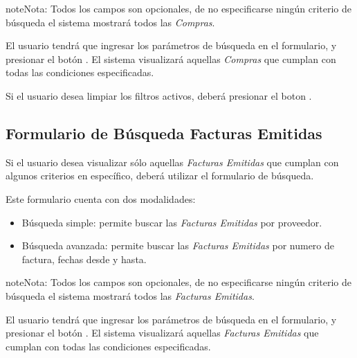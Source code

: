 \documentclass[a4paper,10pt,spanish]{sphinxmanual}
\begin{document}
\begin{notice}{note}{Nota:}
Todos los campos son opcionales, de no especificarse ningún criterio de búsqueda el sistema mostrará todos las \emph{Compras}.
\end{notice}

El usuario tendrá que ingresar los parámetros de búsqueda en el formulario, y presionar el botón . El sistema visualizará aquellas \emph{Compras} que cumplan con todas las condiciones especificadas.

Si el usuario desea limpiar los filtros activos, deberá presionar el boton .



\subsection{Formulario de Búsqueda Facturas Emitidas}
\label{compras:formulario-de-busqueda-facturas-emitidas}\label{compras:formulario-busqueda-factemit}
Si el usuario desea visualizar sólo aquellas \emph{Facturas Emitidas} que cumplan con algunos criterios en específico, deberá utilizar el formulario de búsqueda.


Este formulario cuenta con dos modalidades:
\begin{itemize}
\item {} 
Búsqueda simple: permite buscar las \emph{Facturas Emitidas} por proveedor.

\item {} 
Búsqueda avanzada: permite buscar las \emph{Facturas Emitidas} por numero de factura, fechas desde y hasta.

\end{itemize}

\begin{notice}{note}{Nota:}
Todos los campos son opcionales, de no especificarse ningún criterio de búsqueda el sistema mostrará todos las \emph{Facturas Emitidas}.
\end{notice}

El usuario tendrá que ingresar los parámetros de búsqueda en el formulario, y presionar el botón . El sistema visualizará aquellas \emph{Facturas Emitidas} que cumplan con todas las condiciones especificadas.
\end{document}
